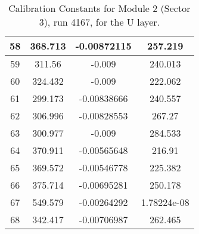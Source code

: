 \begin{table}[h]
{\begin{tabular}{|c|c|c|c|}
58	&	368.713	&	-0.00872115	&	257.219	\\	\hline
59	&	311.56	&	-0.009	&	240.013	\\	\hline
60	&	324.432	&	-0.009	&	222.062	\\	\hline
61	&	299.173	&	-0.00838666	&	240.557	\\	\hline
62	&	306.996	&	-0.00828553	&	267.27	\\	\hline
63	&	300.977	&	-0.009	&	284.533	\\	\hline
64	&	370.911	&	-0.00565648	&	216.91	\\	\hline
65	&	369.572	&	-0.00546778	&	225.382	\\	\hline
66	&	375.714	&	-0.00695281	&	250.178	\\	\hline
67	&	549.579	&	-0.00264292	&	1.78224e-08	\\	\hline
68	&	342.417	&	-0.00706987	&	262.465	\\	\hline

 \end{tabular}
        }
        \caption{Calibration Constants for Module 2 (Sector 3), run 4167, for the U layer.}
\end{table}


